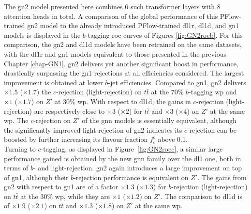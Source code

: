 The \gls{gn2} model presented here combines 6 such transformer layers with 8 attention heads in total. A comparison of the global performance of this PFlow-trained \gls{gn2} model to the already introduced PFlow-trained \gls{dl1r}, \gls{dl1d}, and \gls{gn1} models is displayed in the $b$-tagging \gls{roc} curves of Figures \ref{fig:GN2rocb}. For this comparison, the \gls{gn2} and \gls{dl1d} models have been retrained on the same datasets, with the \gls{dl1r} and \gls{gn1} models equivalent to those presented in the previous Chapter \ref{chap-GN1}. \gls{gn2} delivers yet another significant boost in performance, drastically surpassing the \gls{gn1} rejections at all efficiencies considered. The largest improvement is obtained at lower $b$-jet efficiencies. Compared to \gls{gn1}, \gls{gn2} delivers $\times 1.5$ ($\times 1.7$) the $c$-rejection (light-rejection) on $t\bar{t}$ at the 70\% $b$-tagging \gls{wp} and $\times 1$ ($\times 1.7$) on $Z'$ at 30\% \gls{wp}. With respect to \gls{dl1d}, the gains in $c$-rejection (light-rejection) are respectively close to $\times 3$ ($\times 2$) for $t\bar{t}$ and $\times 3$ ($\times 4$) on $Z'$ at the same \gls{wp}. The $c$-rejection on $Z'$ of the \gls{gnn} models is essentially equivalent, although the significantly improved light-rejection of \gls{gn2} indicates its $c$-rejection can be boosted by further increasing its flavour fraction $f^b_c$ above 0.1. \\

Turning to $c$-tagging, as displayed in Figure~\ref{fig:GN2rocc}, a similar large performance gained is obtained by the new \gls{gnn} family over the \gls{dl1} one, both in terms of $b$- and light-rejection. \gls{gn2} again introduces a large improvement on top of \gls{gn1}, although their $b$-rejection performance is equivalent on $Z'$. The gains from \gls{gn2} with respect to \gls{gn1} are of a factor $\times 1.3$ ($\times 1.3$) for $b$-rejection (light-rejection) on $t\bar{t}$ at the 30\% \gls{wp}, while they are $\times 1$ ($\times 1.2$) on $Z'$. The comparison to \gls{dl1d} is of $\times 1.9$ ($\times 2.1$) on $t\bar{t}$ and $\times 1.3$ ($\times 1.8$) on $Z'$ at the same \gls{wp}.

